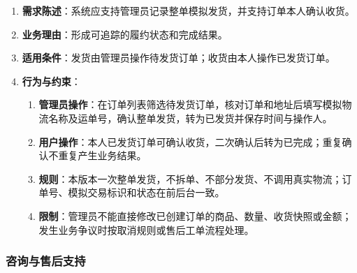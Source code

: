 \begin{enumerate}
\item {\bfseries 需求陈述}：系统应支持管理员记录整单模拟发货，并支持订单本人确认收货。
\item {\bfseries 业务理由}：形成可追踪的履约状态和完成结果。
\item {\bfseries 适用条件}：发货由管理员操作待发货订单；收货由本人操作已发货订单。
\item {\bfseries 行为与约束}：
\begin{enumerate}
\item {\bfseries 管理员操作}：在订单列表筛选待发货订单，核对订单和地址后填写模拟物流名称及运单号，确认整单发货，转为已发货并保存时间与操作人。
\item {\bfseries 用户操作}：本人已发货订单可确认收货，二次确认后转为已完成；重复确认不重复产生业务结果。
\item {\bfseries 规则}：本版本一次整单发货，不拆单、不部分发货、不调用真实物流；订单号、模拟交易标识和状态在前后台一致。
\item {\bfseries 限制}：管理员不能直接修改已创建订单的商品、数量、收货快照或金额；发生业务争议时按取消规则或售后工单流程处理。
\end{enumerate}

\end{enumerate}

\subsubsection{咨询与售后支持}\label{sec:324-咨询与售后支持}


